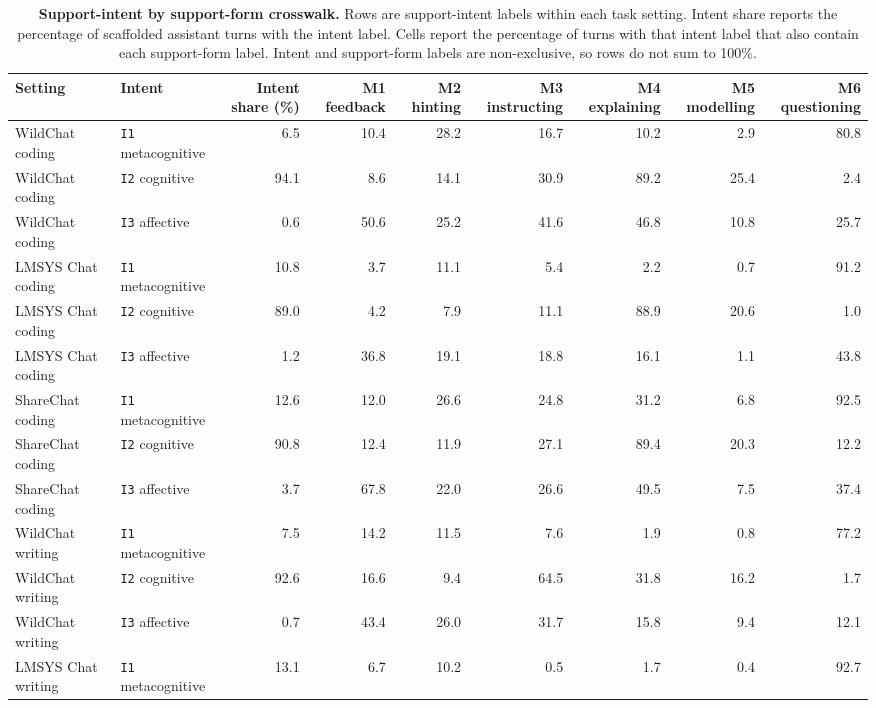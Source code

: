\begin{table}[p]
\centering
\scriptsize
\caption{\textbf{Support-intent by support-form crosswalk.} Rows are support-intent labels within each task setting. Intent share reports the percentage of scaffolded assistant turns with the intent label. Cells report the percentage of turns with that intent label that also contain each support-form label. Intent and support-form labels are non-exclusive, so rows do not sum to 100\%.}
\label{tab:support_intent_form_crosswalk}
\begin{adjustbox}{max width=\textwidth}
\begin{tabular}{@{}llrrrrrrr@{}}
\toprule
Setting & Intent & Intent share (\%) & M1 feedback & M2 hinting & M3 instructing & M4 explaining & M5 modelling & M6 questioning \\
\midrule
WildChat coding & \texttt{I1} metacognitive & 6.5 & 10.4 & 28.2 & 16.7 & 10.2 & 2.9 & 80.8 \\
WildChat coding & \texttt{I2} cognitive & 94.1 & 8.6 & 14.1 & 30.9 & 89.2 & 25.4 & 2.4 \\
WildChat coding & \texttt{I3} affective & 0.6 & 50.6 & 25.2 & 41.6 & 46.8 & 10.8 & 25.7 \\
\addlinespace
LMSYS Chat coding & \texttt{I1} metacognitive & 10.8 & 3.7 & 11.1 & 5.4 & 2.2 & 0.7 & 91.2 \\
LMSYS Chat coding & \texttt{I2} cognitive & 89.0 & 4.2 & 7.9 & 11.1 & 88.9 & 20.6 & 1.0 \\
LMSYS Chat coding & \texttt{I3} affective & 1.2 & 36.8 & 19.1 & 18.8 & 16.1 & 1.1 & 43.8 \\
\addlinespace
ShareChat coding & \texttt{I1} metacognitive & 12.6 & 12.0 & 26.6 & 24.8 & 31.2 & 6.8 & 92.5 \\
ShareChat coding & \texttt{I2} cognitive & 90.8 & 12.4 & 11.9 & 27.1 & 89.4 & 20.3 & 12.2 \\
ShareChat coding & \texttt{I3} affective & 3.7 & 67.8 & 22.0 & 26.6 & 49.5 & 7.5 & 37.4 \\
\addlinespace
WildChat writing & \texttt{I1} metacognitive & 7.5 & 14.2 & 11.5 & 7.6 & 1.9 & 0.8 & 77.2 \\
WildChat writing & \texttt{I2} cognitive & 92.6 & 16.6 & 9.4 & 64.5 & 31.8 & 16.2 & 1.7 \\
WildChat writing & \texttt{I3} affective & 0.7 & 43.4 & 26.0 & 31.7 & 15.8 & 9.4 & 12.1 \\
\addlinespace
LMSYS Chat writing & \texttt{I1} metacognitive & 13.1 & 6.7 & 10.2 & 0.5 & 1.7 & 0.4 & 92.7 \\

\end{tabular}
\end{adjustbox}
\end{table}
